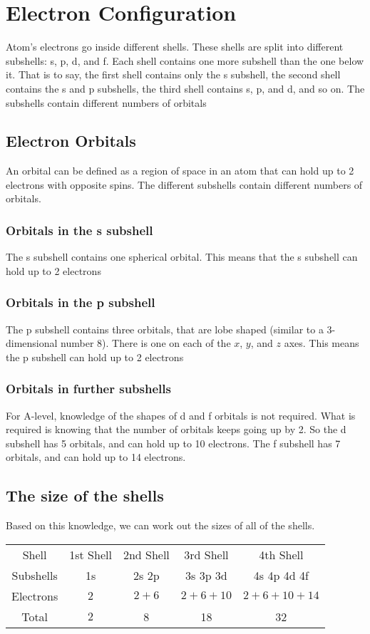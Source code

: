 \section{Electron Configuration}
Atom's electrons go inside different shells. These shells are split into different subshells: s, p, d, and f. Each shell contains one more subshell than the one below it. That is to say, the first shell contains only the s subshell, the second shell contains the s and p subshells, the third shell contains s, p, and d, and so on. The subshells contain different numbers of orbitals
\subsection{Electron Orbitals}
An orbital can be defined as a region of space in an atom that can hold up to 2 electrons with opposite spins. The different subshells contain different numbers of orbitals.
\subsubsection{Orbitals in the s subshell}
The s subshell contains one spherical orbital. This means that the s subshell can hold up to 2 electrons
\subsubsection{Orbitals in the p subshell}
The p subshell contains three orbitals, that are lobe shaped (similar to a 3-dimensional number 8). There is one on each of the $x$, $y$, and $z$ axes. This means the p subshell can hold up to 2 electrons
\subsubsection{Orbitals in further subshells}
For A-level, knowledge of the shapes of d and f orbitals is not required. What is required is knowing that the number of orbitals keeps going up by 2. So the d subshell has 5 orbitals, and can hold up to 10 electrons. The f subshell has 7 orbitals, and can hold up to 14 electrons.

\subsection{The size of the shells}
Based on this knowledge, we can work out the sizes of all of the shells.
\begin{center}
\begin{tabular}{|c|c|c|c|c|}
\hline
Shell     & 1st Shell & 2nd Shell & 3rd Shell & 4th Shell   \\
Subshells & 1s        & 2s 2p     & 3s 3p 3d  & 4s 4p 4d 4f \\
Electrons & $2$       & $2+6$     & $2+6+10$  & $2+6+10+14$ \\
Total     & $2$       & 8         & 18        & 32          \\
\hline
\end{tabular}
\end{center}

